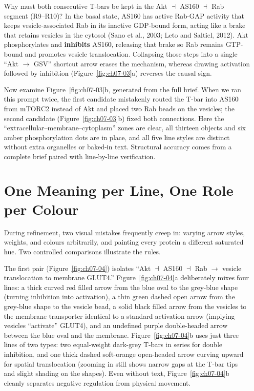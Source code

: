 Why must both consecutive T-bars be kept in the Akt $\dashv$ AS160 $\dashv$ Rab segment (R9--R10)? In the basal state, AS160 has active Rab-GAP activity that keeps vesicle-associated Rab in its inactive GDP-bound form, acting like a brake that retains vesicles in the cytosol (Sano et al., 2003; Leto and Saltiel, 2012). Akt phosphorylates and \textbf{inhibits} AS160, releasing that brake so Rab remains GTP-bound and promotes vesicle translocation. Collapsing those steps into a single ``Akt $\rightarrow$ GSV'' shortcut arrow erases the mechanism, whereas drawing activation followed by inhibition (Figure~\ref{fig:ch07-03}a) reverses the causal sign.

Now examine Figure~\ref{fig:ch07-03}b, generated from the full brief. When we ran this prompt twice, the first candidate mistakenly routed the T-bar into AS160 from mTORC2 instead of Akt and placed two Rab beads on the vesicles; the second candidate (Figure~\ref{fig:ch07-03}b) fixed both connections. Here the ``extracellular--membrane--cytoplasm'' zones are clear, all thirteen objects and six amber phosphorylation dots are in place, and all five line styles are distinct without extra organelles or baked-in text. Structural accuracy comes from a complete brief paired with line-by-line verification.

\section{One Meaning per Line, One Role per Colour}

During refinement, two visual mistakes frequently creep in: varying arrow styles, weights, and colours arbitrarily, and painting every protein a different saturated hue. Two controlled comparisons illustrate the rules.

The first pair (Figure~\ref{fig:ch07-04}) isolates ``Akt $\dashv$ AS160 $\dashv$ Rab $\rightarrow$ vesicle translocation to membrane GLUT4.'' Figure~\ref{fig:ch07-04}a deliberately mixes four lines: a thick curved red filled arrow from the blue oval to the grey-blue shape (turning inhibition into activation), a thin green dashed open arrow from the grey-blue shape to the vesicle bead, a solid black filled arrow from the vesicles to the membrane transporter identical to a standard activation arrow (implying vesicles ``activate'' GLUT4), and an undefined purple double-headed arrow between the blue oval and the membrane. Figure~\ref{fig:ch07-04}b uses just three lines of two types: two equal-weight dark-grey T-bars in series for double inhibition, and one thick dashed soft-orange open-headed arrow curving upward for spatial translocation (zooming in still shows narrow gaps at the T-bar tips and slight shading on the shapes). Even without text, Figure~\ref{fig:ch07-04}b cleanly separates negative regulation from physical movement.

